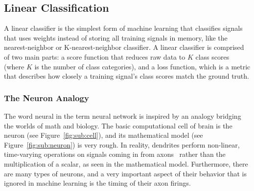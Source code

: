 \subsection{Linear Classification}
\label{linclass}
A linear classifier is the simplest form of machine learning that classifies signals that uses weights instead of storing all training signals in memory, like the nearest-neighbor or K-nearest-neighbor classifier. A linear classifier is comprised of two main parts: a score function that reduces raw data to $K$ class scores (where $K$ is the number of class categories), and a loss function, which is a metric that describes how closely a training signal's class scores match the ground truth.
\subsubsection{The Neuron Analogy}
The word neural in the term neural network is inspired by an analogy bridging the worlds of math and biology. The basic computational cell of brain is the neuron (see Figure~\ref{fig:sub:cell}), and its mathematical model (see Figure~\ref{fig:sub:neuron}) is very rough. In reality, dendrites perform non-linear, time-varying operations on signals coming in from axons~\cite{cs231} rather than the multiplication of a scalar, as seen in the mathematical model. Furthermore, there are many types of neurons, and a very important aspect of their behavior that is ignored in machine learning is the timing of their axon firings. 

